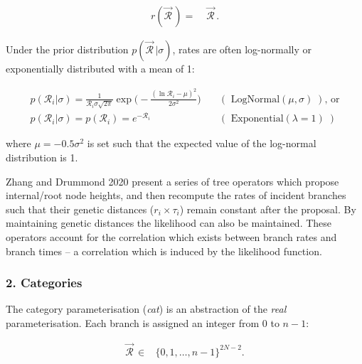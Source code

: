 \documentclass[10pt,letterpaper]{article}
\begin{document}
\begin{align}
r(\vec{\mathcal{R}}^{\,}) =& \; \vec{\mathcal{R}}^{\,}.
\end{align}


Under the prior distribution $p(\vec{\mathcal{R}}^{\,} | \sigma)$, rates are often log-normally or exponentially distributed with a mean of 1:

\begin{align}
p(\mathcal{R}_i | \sigma) = \frac{1}{\mathcal{R}_i \sigma \sqrt{2\pi}} \exp \big( -\frac{(\ln \mathcal{R}_i - \mu)^2}{2\sigma^2} \big) \quad &(\text{ LogNormal}(\mu, \sigma)\;) \text{, or}  \\
p(\mathcal{R}_i | \sigma) = p(\mathcal{R}_i) = e^{-\mathcal{R}_i} \quad &(\text{ Exponential}(\lambda=1)\;)
\end{align}


where $\mu = -0.5\sigma^2$ is set such that the expected value of the log-normal distribution is 1.


Zhang and Drummond 2020 present a series of tree operators which propose internal/root node heights, and then recompute the rates of incident branches such that their genetic distances ($r_i \times \tau_i$) remain constant after the proposal. By maintaining genetic distances the likelihood can also be maintained. These operators account for the correlation which exists between branch rates and branch times -- a correlation which is induced by the likelihood function.







\subsubsection*{2. Categories}
The category parameterisation (\textit{cat}) is an abstraction of the \textit{real} parameterisation. Each branch is assigned an integer from $0$ to $n-1$:

\begin{align}
\vec{\mathcal{R}}^{\,} \in& \{ 0, 1, \dotso, n-1 \}^{2N-2}.
\end{align}
\end{document}
